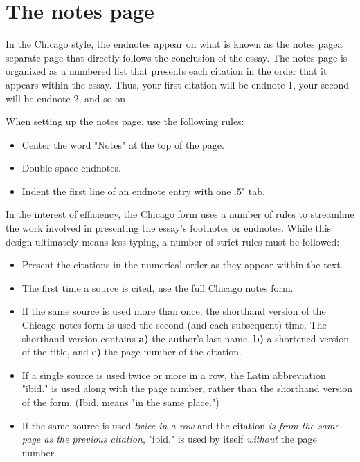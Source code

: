 \section{The notes page}

In the Chicago style, the endnotes appear on what is known as the notes 
page\textemdash a separate page that directly follows the conclusion of the essay. The 
notes page is organized as a numbered list that presents each citation in the order that 
it appears within the essay. Thus, your first citation will be endnote 1, your second will 
be endnote 2, and so on.

When setting up the notes page, use the following rules:

\begin{itemize}
\item Center the word "Notes" at the top of the page.
\item Double-space endnotes.
\item Indent the first line of an endnote entry with one .5" tab.
\end{itemize}

In the interest of efficiency, the Chicago form uses a number of rules to streamline the 
work involved in presenting the essay's footnotes or endnotes. While this design 
ultimately means less typing, a number of strict rules must be followed:

\begin{itemize}
\item Present the citations in the numerical order as they appear within the text.

\item The first time a source is cited, use the full Chicago notes form.

\item If the same source is used more than once, the shorthand version of the Chicago 
notes form is used the second (and each subsequent) time. The shorthand version 
contains \textbf{a)} the author's last name, \textbf{b)} a shortened version of the title, 
and \textbf{c)} the page number of the citation.

\item If a single source is used twice or more in a row, the Latin abbreviation "ibid." is 
used along with the page number, rather than the shorthand version of the form. 
(Ibid. means "in the same place.")

\item If the same source is used \emph{twice in a row} and the citation \emph{is from 
the same page as the previous citation}, "ibid." is used by itself \emph{without} the 
page number. 
\end{itemize}

